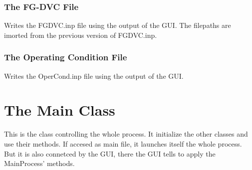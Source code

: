 \documentclass[letterpaper,10pt,english]{sphinxmanual}
\begin{document}
\subsection{The FG-DVC File}
\label{GUI:the-fg-dvc-file}

\begin{fulllineitems}
\label{GUI:writeInfoFiles.WriteFGFile}
Writes the FGDVC.inp file using the output of the GUI. The filepaths are imorted from the previous version of FGDVC.inp.

\end{fulllineitems}



\subsection{The Operating Condition File}
\label{GUI:the-operating-condition-file}

\begin{fulllineitems}
\label{GUI:writeInfoFiles.WriteOCFile}
Writes the OperCond.inp file using the output of the GUI.

\end{fulllineitems}



\chapter{The Main Class}
\label{MainProgramCode:the-main-class}\label{MainProgramCode::doc}
This is the class controlling the whole process. It initialize the other classes and use their methods. If accesed as main file, it launches itself the whole process. But it is also connetced by the GUI, there the GUI tells to apply the MainProcess' methods.
\end{document}
